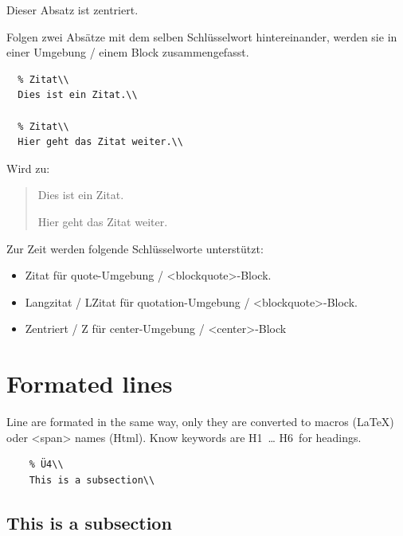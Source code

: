 \documentclass{scrartcl}
\begin{document}
\begin{center}
Dieser Absatz ist zentriert.

\end{center}

Folgen zwei Absätze mit dem selben Schlüsselwort
hintereinander, werden sie in einer Umgebung / einem Block
zusammengefasst.

\begin{verbatim}
  % Zitat\\
  Dies ist ein Zitat.\\

  % Zitat\\
  Hier geht das Zitat weiter.\\

\end{verbatim}

Wird zu:

\begin{quote}
Dies ist ein Zitat.

Hier geht das Zitat weiter.

\end{quote}

Zur Zeit werden folgende Schlüsselworte unterstützt:

\begin{itemize}
\item Zitat für quote-Umgebung / <blockquote>-Block.
\item Langzitat / LZitat für quotation-Umgebung / <blockquote>-Block.
\item Zentriert / Z für center-Umgebung / <center>-Block

\end{itemize}

\section{Formated lines}

Line are formated in the same way, only they are converted
to macros (LaTeX) oder <span> names (Html). Know keywords
are H1~… H6~for headings.

\begin{verbatim}
    % Ü4\\
    This is a subsection\\

\end{verbatim}

\subsection{This is a subsection}
\end{document}
